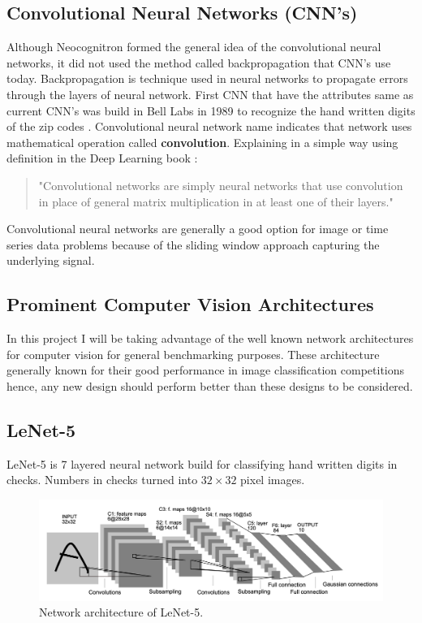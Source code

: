 \documentclass[12pt, twoside, a4paper]{article}
\begin{document}
\subsection{Convolutional Neural Networks (CNN's)}
Although Neocognitron formed the general idea of the convolutional neural networks, it did not used the method called backpropagation that CNN's use today. Backpropagation is technique used in neural networks to propagate errors through the layers of neural network. First CNN that have the attributes same as current CNN's was build in Bell Labs in 1989 to recognize the hand written digits of the zip codes \cite{cnnzipcodes}. Convolutional neural network name indicates that network uses mathematical operation called \textbf{convolution}. Explaining in a simple way using definition in the Deep Learning book \cite{deeplearningbook}:

\begin{quote}
    "Convolutional networks are simply neural networks that use convolution in place of general matrix multiplication in at least one of their layers."
\end{quote}

Convolutional neural networks are generally a good option for image or time series data problems because of the sliding window approach capturing the underlying signal.

\subsection{Prominent Computer Vision Architectures}
In this project I will be taking advantage of the well known network architectures for computer vision for general benchmarking purposes. These architecture generally known for their good performance in image classification competitions hence, any new design should perform better than these designs to be considered. 

\subsection{LeNet-5}
LeNet-5 \cite{Lenet5} is 7 layered neural network build for classifying hand written digits in checks. Numbers in checks turned into  $32 \times 32$ pixel images.

\begin{figure}[H]%
    \centering
    \includegraphics[width=\textwidth]{img/lenet-5.png}%
    \caption{Network architecture of LeNet-5.}%
    \label{fig:lenet5}%
\end{figure}
\end{document}
